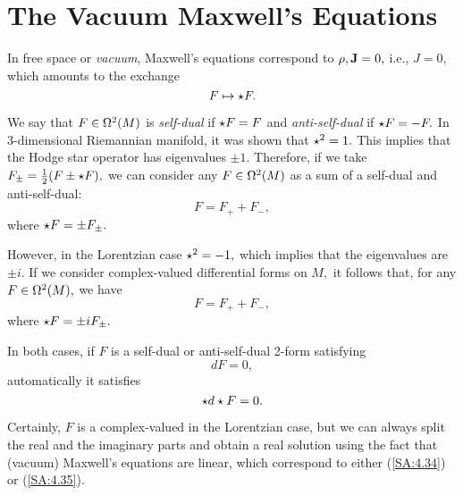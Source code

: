 \section{The Vacuum Maxwell's Equations}

In free space or \emph{vacuum}, Maxwell's equations correspond to $\rho, \textbf{J}=0,$ i.e., $J=0,$ which amounts to the
exchange 
$$
F \mapsto \star F.
$$

We say that $F \in \Omega^{2}(M)$ is \emph{self-dual} if $\star F = F$ and \emph{anti-self-dual} if $\star F = - F.$ In
3-dimensional Riemannian manifold, it was shown that $\star^{2}=1.$ This implies that the Hodge star operator has
eigenvalues $\pm 1.$ Therefore, if we take $F_{\pm}=\frac{1}{2}(F\pm \star F),$ we can consider any $F \in \Omega^{2}(M)$
as a sum of a self-dual and anti-self-dual:
$$
F=F_{+}+F_{-},
$$
where $\star F = \pm F_{\pm}.$

However, in the Lorentzian case $\star ^{2}=-1,$ which implies that the eigenvalues are $\pm i.$ If we consider
complex-valued differential forms on $M,$ it follows that, for any $F \in \Omega^{2}(M),$ we have
$$
F=F_{+}+F_{-},
$$
where $\star F = \pm i F_{\pm}.$

In both cases, if $F$ is a self-dual or anti-self-dual 2-form satisfying 
\begin{equation}
 \label{SA:4.34}
dF=0,
\end{equation}
 automatically it satisfies 
\begin{equation}
 \label{SA:4.35}
\star d \star F = 0.
\end{equation}

Certainly, $F$ is a complex-valued in the Lorentzian case, but we can always split the real and the imaginary parts and
obtain a real solution using the fact that (vacuum) Maxwell's equations are linear, which correspond to either
(\ref{SA:4.34}) or (\ref{SA:4.35}).


